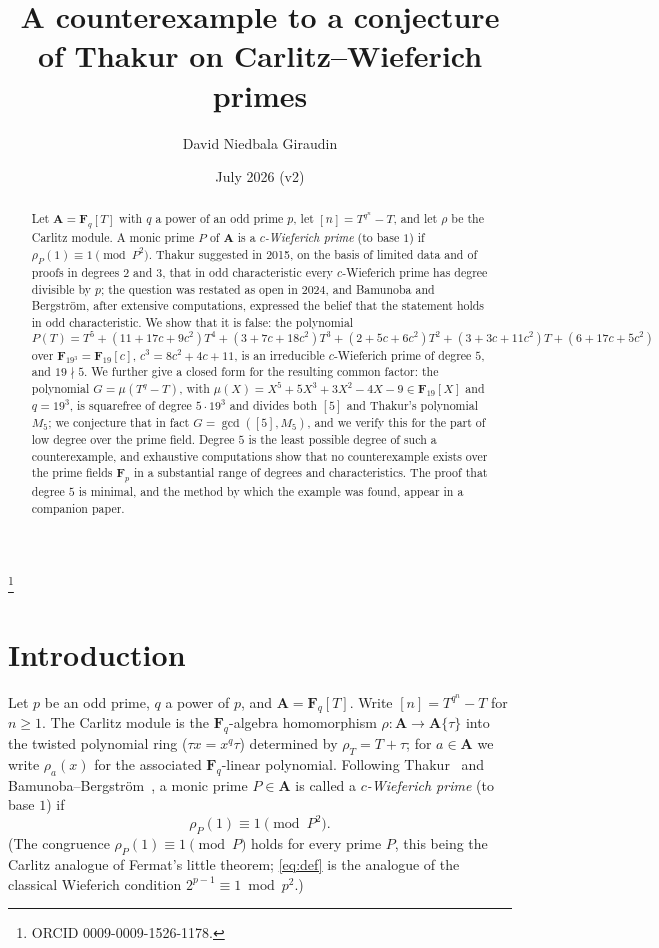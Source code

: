 \documentclass[11pt]{amsart}
\newcommand{\A}{\mathbf{A}}
\newcommand{\F}{\mathbf{F}}
\theoremstyle{plain}
\theoremstyle{definition}
\begin{document}
\title{A counterexample to a conjecture of Thakur on Carlitz--Wieferich primes}
\author{David Niedbala Giraudin}
\address{Independent researcher, Meaux, France}
\thanks{ORCID 0009-0009-1526-1178.}
\date{July 2026 (v2)}

\begin{abstract}
Let $\A=\F_q[T]$ with $q$ a power of an odd prime $p$, let $[n]=T^{q^n}-T$, and
let $\rho$ be the Carlitz module. A monic prime $P$ of $\A$ is a
\emph{$c$-Wieferich prime} (to base $1$) if $\rho_P(1)\equiv1\pmod{P^2}$.
Thakur suggested in 2015, on the basis of limited data and of proofs in
degrees $2$ and $3$, that in odd characteristic every $c$-Wieferich prime has
degree divisible by $p$; the question was restated as open in 2024, and
Bamunoba and Bergstr\"om, after extensive computations, expressed the belief
that the statement holds in odd characteristic. We show that it is false: the
polynomial
\[
P(T)=T^5+(11+17c+9c^2)T^4+(3+7c+18c^2)T^3+(2+5c+6c^2)T^2+(3+3c+11c^2)T+(6+17c+5c^2)
\]
over $\F_{19^3}=\F_{19}[c]$, $c^3=8c^2+4c+11$, is an irreducible $c$-Wieferich
prime of degree $5$, and $19\nmid5$. We further give a closed form for the
resulting common factor: the polynomial $G=\mu(T^q-T)$, with
$\mu(X)=X^5+5X^3+3X^2-4X-9\in\F_{19}[X]$ and $q=19^3$, is squarefree of degree
$5\cdot19^3$ and divides both $[5]$ and Thakur's polynomial $M_5$; we conjecture
that in fact $G=\gcd([5],M_5)$, and we verify this for the part of low degree
over the prime field. Degree $5$ is the least possible degree of such a
counterexample, and exhaustive computations show that no counterexample exists
over the prime fields $\F_p$ in a substantial range of degrees and
characteristics. The proof that degree $5$ is minimal, and the method by which
the example was found, appear in a companion paper.
\end{abstract}

\maketitle

\section{Introduction}

Let $p$ be an odd prime, $q$ a power of $p$, and $\A=\F_q[T]$. Write
$[n]=T^{q^n}-T$ for $n\ge1$. The Carlitz module is the $\F_q$-algebra
homomorphism $\rho\colon\A\to\A\{\tau\}$ into the twisted polynomial ring
($\tau x=x^q\tau$) determined by $\rho_T=T+\tau$; for $a\in\A$ we write
$\rho_a(x)$ for the associated $\F_q$-linear polynomial. Following
Thakur~\cite{Tha15} and Bamunoba--Bergstr\"om~\cite{BB}, a monic prime
$P\in\A$ is called a \emph{$c$-Wieferich prime} (to base $1$) if
\begin{equation}\label{eq:def}
\rho_P(1)\equiv1\pmod{P^2}.
\end{equation}
(The congruence $\rho_P(1)\equiv1\pmod P$ holds for every prime $P$, this being
the Carlitz analogue of Fermat's little theorem; \eqref{eq:def} is the analogue
of the classical Wieferich condition $2^{p-1}\equiv1\bmod p^2$.)
\end{document}

